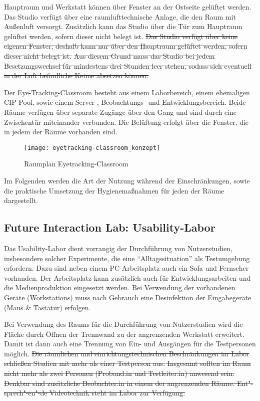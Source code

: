 Hauptraum und Werkstatt können über Fenster an der Ostseite gelüftet werden.
Das Studio verfügt über eine raumlufttechnische Anlage, die den Raum mit Außenluft versorgt.
Zusätzlich kann das Studio über die Tür zum Hauptraum gelüftet werden, sofern dieser nicht belegt ist.
\sout{Das Studio verfügt über keine eigenen Fenster, deshalb kann nur über den Hauptraum gelüftet werden, sofern dieser nicht belegt ist.}
\sout{Aus diesem Grund muss das Studio bei jedem Besetzungswechsel für mindestens drei Stunden leer stehen, sodass sich eventuell in der Luft befindliche Keime absetzen können.}

\medskip
\noindent
Der Eye-Tracking-Classroom besteht aus einem Laborbereich, einem ehemaligen CIP-Pool, sowie einem Server-, Beobachtungs- und Entwicklungsbereich. Beide Räume verfügen über separate Zugänge über den Gang und sind durch eine Zwischentür miteinander verbunden.
Die Belüftung erfolgt über die Fenster, die in jedem der Räume vorhanden sind.

\medskip
\begin{figure}[h]
    \label{fig:raumplan_eyetracking}
    \centering
    \texttt{[image: eyetracking-classroom\_konzept]}
    \caption{Raumplan Eyetracking-Classroom}
\end{figure}

\medskip
\noindent
Im Folgenden werden die Art der Nutzung während der Einschränkungen, sowie die praktische Umsetzung der Hygienemaßnahmen für jeden der Räume dargestellt.

\subsection{Future Interaction Lab: Usability-Labor}\label{subsec:labore_fil_labor}


\noindent
Das Usability-Labor dient vorrangig der Durchführung von Nutzerstudien, insbesondere solcher Experimente, die eine ``Alltagssituation'' als Testumgebung erfordern. Dazu sind neben einem PC-Arbeitsplatz auch ein Sofa und Fernseher vorhanden.
Der Arbeitsplatz kann zusätzlich auch für Entwicklungsarbeiten und die Medienproduktion eingesetzt werden.
Bei Verwendung der vorhandenen Geräte (Workstations) muss nach Gebrauch eine Desinfektion der Eingabegeräte (Maus \& Tastatur) erfolgen.

\medskip
\noindent
Bei Verwendung des Raums für die Durchführung von Nutzerstudien wird die Fläche  durch Öffnen der Trennwand zu der angrenzenden Werkstatt erweitert. Damit ist dann auch eine Trennung von Ein- und Ausgängen für die Testpersonen möglich.
\sout{Die räumlichen und einrichtungstechnischen Beschränkungen im Labor schließen Studien mit mehr als einer Testperson aus. Insgesamt sollten im Raum nicht mehr als zwei Personen (Proband:in und Testleiter:in) anwesend sein. Denkbar sind zusätzliche Beobachter:in in einem der angrenzenden Räume. Ent"-sprech"-en"-de Videotechnik steht im Labor zur Verfügung.}

